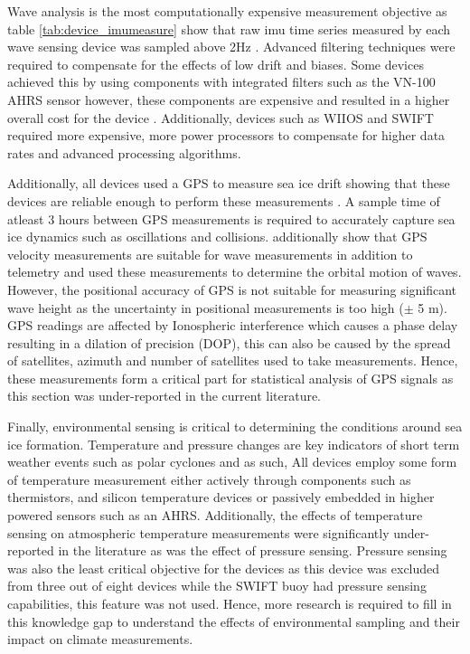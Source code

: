Wave analysis is the most computationally expensive measurement objective as 
table \ref{tab:device_imumeasure} show that raw imu time series measured by each wave sensing device was sampled above 2Hz \cite{kohout2015device}. Advanced filtering techniques were required to compensate for the effects of low drift and biases. Some devices achieved this by using components with integrated filters such as the VN-100 AHRS sensor however, these components  are expensive and resulted in a higher overall cost for the device \cite{guimaraes2018surface}. Additionally, devices such as WIIOS and SWIFT required more expensive, more power processors to compensate for higher data rates and advanced processing algorithms. \par 

Additionally, all devices used a GPS to measure sea ice drift showing that these devices are reliable enough to perform these measurements \cite{doble2017robust}. A sample time of atleast 3 hours between GPS measurements is required to accurately capture sea ice dynamics such as oscillations and collisions. \textcite{thomson2012wave} additionally show that GPS velocity measurements are suitable for wave measurements in addition to telemetry and used these measurements to determine the orbital motion of waves. However, the positional accuracy of GPS is not suitable for measuring significant wave height as the uncertainty in positional measurements is too high ($\pm$ 5 m). GPS readings are affected by Ionospheric interference which causes a phase delay resulting in a dilation of precision (DOP), this can also be caused by the spread of satellites, azimuth and number of satellites used to take measurements. Hence, these measurements form a critical part for statistical analysis of GPS signals as this section was under-reported in the current literature. \par 

Finally, environmental sensing is critical to determining the conditions around sea ice formation. Temperature and pressure changes are key indicators of short term weather events such as polar cyclones and as such, All devices employ some form of temperature measurement either actively through components such as thermistors, and silicon temperature devices or passively embedded in higher powered sensors such as an AHRS. Additionally, the effects of temperature sensing on atmospheric temperature measurements were significantly under-reported in the literature as was the effect of pressure sensing.  Pressure sensing was also the least critical objective for the devices as this device was excluded from three out of eight devices while the SWIFT buoy had pressure sensing capabilities, this feature was not used. Hence, more research is required to fill in this knowledge gap to understand the effects of environmental sampling and their impact on climate measurements. \par

